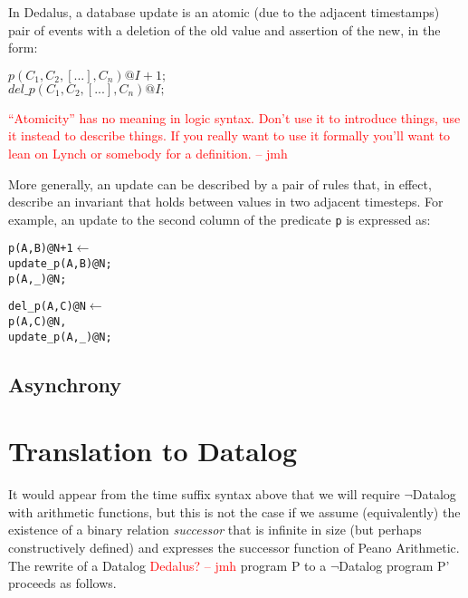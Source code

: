 \documentclass{acm_proc_article-sp-sigmod09}
\newcommand{\jmh}[1]{{\textcolor{red}{#1 -- jmh}}}
\newenvironment{Dedalus}{
\vspace{0.5em}\begin{minipage}{0.95\textwidth}%
\begin{alltt}\fontsize{9pt}{9pt}\selectfont}
{\end{alltt}\end{minipage}\vspace{0.5em}}
\newcommand{\dedalus}[1]{\texttt{\fontsize{9pt}{9pt}\selectfont #1}}
\begin{document}
In Dedalus, a database update is an atomic (due to the adjacent timestamps)
pair of events with a deletion of the old value and assertion of the new, in
the form:

$p(C_{1},C_{2},[...],C_{n})@I+1;$
\\
$del\_p(C_{1},C_{2},[...],C_{n})@I;$

\jmh{``Atomicity'' has no meaning in logic syntax.  Don't use it to introduce things, use it instead to describe things.  If you really want to use it formally you'll want to lean on Lynch or somebody for a definition.}

More generally, an update can be described by a pair of rules that, in effect,
describe an invariant that holds between values in two adjacent timesteps.
For example, an update to the second column of the predicate \dedalus{p} is
expressed as:

\begin{Dedalus}
p(A, B)@N+1 \(\leftarrow\)
  update_p(A, B)@N;
  p(A, _)@N;
  
del_p(A, C)@N \(\leftarrow\)
  p(A, C)@N,
  update_p(A, _)@N;
\end{Dedalus}

\subsection{Asynchrony}



\section{Translation to Datalog}

It would appear from the time suffix syntax above that we will require $\lnot$Datalog with arithmetic functions, but this is not the case if we assume
(equivalently) the existence of a binary relation \emph{successor} that is infinite in size (but perhaps constructively defined) and expresses the 
successor function of Peano Arithmetic.  The rewrite of a Datalog \jmh{Dedalus?} program P to a $\lnot$Datalog program P' proceeds as follows.
\end{document}
